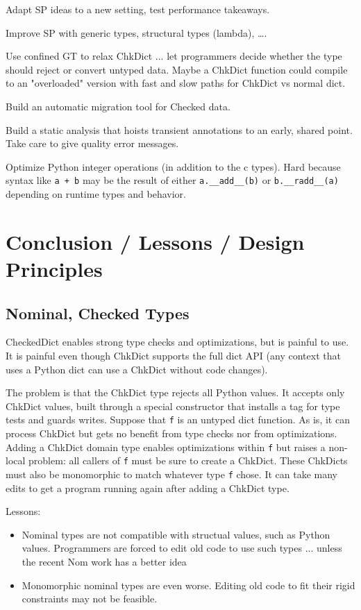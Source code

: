 \documentclass[english,cleveref,submission]{programming}
\newcommand{\code}[1]{\texttt{#1}}
\begin{document}
Adapt SP ideas to a new setting, test performance takeaways.

Improve SP with generic types, structural types (lambda), \ldots.

Use confined GT to relax ChkDict ... let programmers decide whether
the type should reject or convert untyped data.
Maybe a ChkDict function could compile to an "overloaded" version with
fast and slow paths for ChkDict vs normal dict.

Build an automatic migration tool for Checked data.

Build a static analysis that hoists transient annotations to an early, shared point.
Take care to give quality error messages.

Optimize Python integer operations (in addition to the c types).
Hard because syntax like \code{a + b} may be the result of either \code{a.\_\_add\_\_(b)}
or \code{b.\_\_radd\_\_(a)} depending on runtime types and behavior.


\section{Conclusion / Lessons / Design Principles}
\label{s:conclusion}

\subsection{Nominal, Checked Types}
\label{s:concrete-migration}

CheckedDict enables strong type checks and optimizations, but is painful to use.
It is painful even though ChkDict supports the full dict API
(any context that uses a Python dict can use a ChkDict without code changes).

The problem is that the ChkDict type rejects all Python values.
It accepts only ChkDict values, built through a special constructor
that installs a tag for type tests and guards writes.
Suppose that \code{f} is an untyped dict function.
As is, it can process ChkDict but gets no benefit from type checks nor from optimizations.
Adding a ChkDict domain type enables optimizations within \code{f} but raises a non-local
problem: all callers of \code{f} must be sure to create a ChkDict.
These ChkDicts must also be monomorphic to match whatever type \code{f} chose.
It can take many edits to get a program running again after adding a ChkDict type.

Lessons:
\begin{itemize}
  \item
    Nominal types are not compatible with structual values, such as Python values.
    Programmers are forced to edit old code to use such types ... unless the recent Nom work has a better idea~\cite{mt-oopsla-2021}
  \item
    Monomorphic nominal types are even worse.
    Editing old code to fit their rigid constraints may not be feasible.

\end{itemize}
\end{document}
